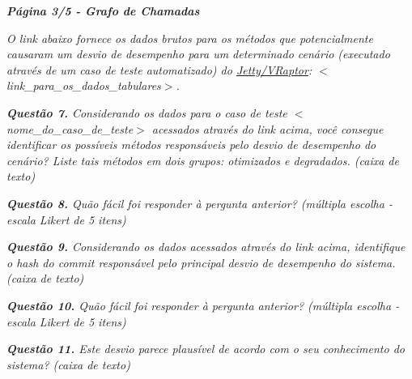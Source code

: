 \begin{framed}
	\noindent \textit{\textbf{Página 3/5 - Grafo de Chamadas}}
	\par
	\noindent \textit{O link abaixo fornece os dados brutos para os métodos que potencialmente causaram um desvio de desempenho para um determinado cenário (executado através de um caso de teste automatizado) do \underline{Jetty/VRaptor}: {\(<\)}link\_para\_os\_dados\_tabulares{\(>\)}.}
	
	\noindent \textit{\textbf{Questão 7.} Considerando os dados para o caso de teste {\(<\)}nome\_do\_caso\_de\_teste{\(>\)} acessados através do link acima, você consegue identificar os possíveis métodos responsáveis pelo desvio de desempenho do cenário? Liste tais métodos em dois grupos: otimizados e degradados. (caixa de texto)}
	\par
	\noindent \textit{\textbf{Questão 8.} Quão fácil foi responder à pergunta anterior? (múltipla escolha - escala Likert de 5 itens)}
	\par
	\noindent \textit{\textbf{Questão 9.} Considerando os dados acessados através do link acima, identifique o hash do commit responsável pelo principal desvio de desempenho do sistema. (caixa de texto)}
	\par
	\noindent \textit{\textbf{Questão 10.} Quão fácil foi responder à pergunta anterior? (múltipla escolha - escala Likert de 5 itens)}
	\par
	\noindent \textit{\textbf{Questão 11.} Este desvio parece plausível de acordo com o seu conhecimento do sistema? (caixa de texto)}
\end{framed}

